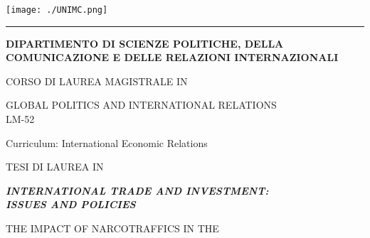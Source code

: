 \begin{titlepage}
\pagestyle{empty}


\begin{center}
\texttt{[image: ./UNIMC.png]}

\vspace*{1cm}

\hrule

\vspace*{1.25cm}
 
\begin{large}
\textbf{DIPARTIMENTO DI SCIENZE POLITICHE, DELLA}\\
\textbf{COMUNICAZIONE E DELLE RELAZIONI INTERNAZIONALI}
\end{large}

\vspace*{1.7cm}  

\begin{large}
CORSO DI LAUREA MAGISTRALE IN
\end{large}

\vspace*{0.25cm}  

\begin{large}
GLOBAL POLITICS AND INTERNATIONAL RELATIONS\\
LM-52
\end{large}

\vspace*{0.35cm}  

\begin{large}
Curriculum: International Economic Relations
\end{large}

\vspace*{2cm}

\begin{large}
TESI DI LAUREA IN 	
\end{large}

\vspace*{0.25cm}  

\begin{Large}
\textbf{\textit{INTERNATIONAL TRADE AND INVESTMENT:}}\\
\textbf{\textit{ISSUES AND POLICIES}}
\end{Large}

\vspace*{2cm}

\begin{Large}
THE IMPACT OF NARCOTRAFFICS IN THE


\end{Large}
\end{center}
\end{titlepage}
